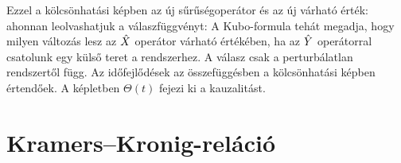   Ezzel a kölcsönhatási képben az új sűrűségoperátor és az új várható érték:
  ahonnan leolvashatjuk a válaszfüggvényt:
  A Kubo-formula tehát megadja, hogy milyen változás lesz az $\hat{X}$ operátor várható értékében, ha az $\hat{Y}$ operátorral csatolunk egy külső teret a rendszerhez. A válasz csak a perturbálatlan rendszertől függ. Az időfejlődések az összefüggésben a kölcsönhatási képben értendőek. A képletben $\Theta(t)$ fejezi ki a kauzalitást. 
  
 \section{Kramers--Kronig-reláció}
  
